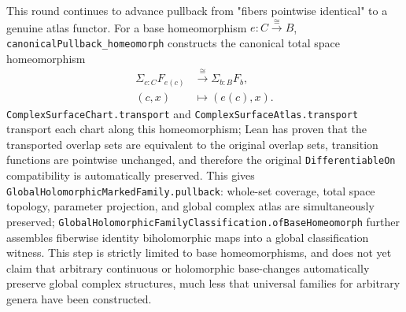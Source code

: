 \documentclass[UTF8,a4paper,11pt]{article}
\begin{document}
This round continues to advance pullback from "fibers pointwise identical" to a genuine atlas functor. For a base homeomorphism
\(e:C\mathbin{\xrightarrow{\cong}}B\),
\texttt{canonicalPullback\_homeomorph} constructs the canonical total space homeomorphism
\[
  \begin{aligned}
  \Sigma_{c:C}F_{e(c)}&\xrightarrow{\cong}\Sigma_{b:B}F_b,\\
  (c,x)&\longmapsto(e(c),x).
  \end{aligned}
\]
\texttt{ComplexSurfaceChart.transport} and
\texttt{ComplexSurfaceAtlas.transport} transport each chart along this homeomorphism; Lean has proven that the transported overlap sets are equivalent to the original overlap sets, transition functions are pointwise unchanged, and therefore the original
\texttt{DifferentiableOn} compatibility is automatically preserved.
This gives \texttt{GlobalHolomorphic\allowbreak Marked\allowbreak Family\allowbreak.pullback}: whole-set coverage, total space topology, parameter projection, and global complex atlas are simultaneously preserved;
\texttt{GlobalHolomorphic\allowbreak Family\allowbreak Classification\allowbreak.ofBaseHomeomorph} further assembles fiberwise identity biholomorphic maps into a global classification witness.
This step is strictly limited to base homeomorphisms, and does not yet claim that arbitrary continuous or holomorphic base-changes automatically preserve global complex structures, much less that universal families for arbitrary genera have been constructed.
\end{document}
